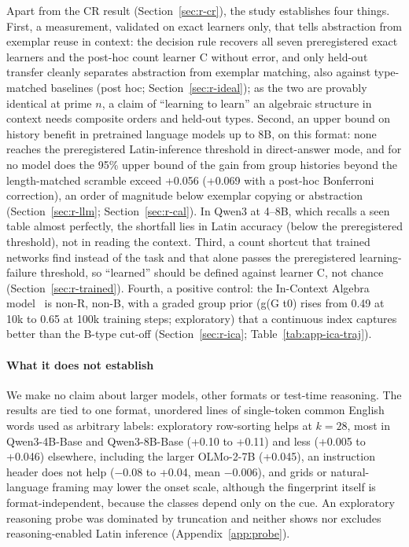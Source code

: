 \documentclass[11pt]{article}
\begin{document}
Apart from the CR result (Section~\ref{sec:r-cr}), the study establishes four things. First, a measurement, validated on exact learners only, that tells abstraction from exemplar reuse in context: the decision rule recovers all seven preregistered exact learners and the post-hoc count learner C without error, and only held-out transfer cleanly separates abstraction from exemplar matching, also against type-matched baselines (post hoc; Section~\ref{sec:r-ideal}); as the two are provably identical at prime $n$, a claim of ``learning to learn'' an algebraic structure in context needs composite orders and held-out types. Second, an upper bound on history benefit in pretrained language models up to 8B, on this format: none reaches the preregistered Latin-inference threshold in direct-answer mode, and for no model does the 95\% upper bound of the gain from group histories beyond the length-matched scramble exceed +0.056 (+0.069 with a post-hoc Bonferroni correction), an order of magnitude below exemplar copying or abstraction (Section~\ref{sec:r-llm}; Section~\ref{sec:r-cal}). In Qwen3 at 4--8B, which recalls a seen table almost perfectly, the shortfall lies in Latin accuracy (below the preregistered threshold), not in reading the context. Third, a count shortcut that trained networks find instead of the task and that alone passes the preregistered learning-failure threshold, so ``learned'' should be defined against learner C, not chance (Section~\ref{sec:r-trained}). Fourth, a positive control: the In-Context Algebra model~\cite{todd2026ica} is non-R, non-B, with a graded group prior (g(G t0) rises from 0.49 at 10k to 0.65 at 100k training steps; exploratory) that a continuous index captures better than the B-type cut-off (Section~\ref{sec:r-ica}; Table~\ref{tab:app-ica-traj}).

\paragraph{What it does not establish}

We make no claim about larger models, other formats or test-time reasoning. The results are tied to one format, unordered lines of single-token common English words used as arbitrary labels: exploratory row-sorting helps at $k = 28$, most in Qwen3-4B-Base and Qwen3-8B-Base (+0.10 to +0.11) and less (+0.005 to +0.046) elsewhere, including the larger OLMo-2-7B (+0.045), an instruction header does not help ($-$0.08 to +0.04, mean $-$0.006), and grids or natural-language framing may lower the onset scale, although the fingerprint itself is format-independent, because the classes depend only on the cue. An exploratory reasoning probe was dominated by truncation and neither shows nor excludes reasoning-enabled Latin inference (Appendix~\ref{app:probe}).
\end{document}
